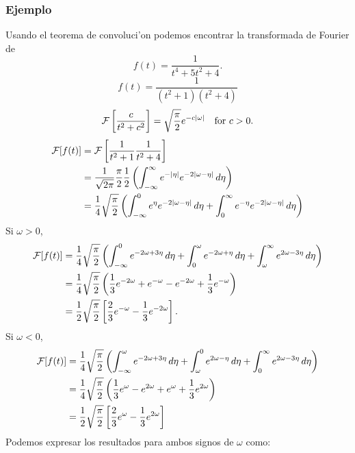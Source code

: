 \subsubsection{Ejemplo} Usando el teorema de convoluci'on podemos encontrar la transformada de Fourier de 
\begin{equation}
 f(t) =\frac{1}{t^4 + 5 t^2 + 4}. 
\end{equation}
\begin{equation}
 f(t) =\frac{1}{(t^2+1)(t^2+4)}
\end{equation}
\begin{equation}
{\cal F}\left[\frac{c}{t^2+c^2}\right] = \sqrt{\frac{\pi}{2}}e^{-c |\omega|}\quad\text{for }c > 0. 
\end{equation}
\begin{align}
{\cal F}[f(t)]
 &={\cal F}\left[\frac{1}{t^2+1}\frac{1}{t^2+4}\right] 
\\
 &=\frac{1}{\sqrt{2\pi}}\frac{\pi}{2}\frac{1}{2}\left(\int_{-\infty}^\infty e^{-|\eta|} e^{-2|\omega -\eta|}\,d\eta\right) 
\\
 &=\frac{1}{4}\sqrt{\frac{\pi}{2}}\left(\int_{-\infty}^0 e^\eta e^{-2|\omega -\eta|}\,d\eta
 +\int_0^\infty e^{-\eta} e^{-2|\omega -\eta|}\,d\eta\right)
\end{align}
Si $\omega > 0$,
\begin{align}
{\cal F}[f(t)]
 &=\frac{1}{4}\sqrt{\frac{\pi}{2}}\left(\int_{-\infty}^0 e^{-2\omega + 3\eta}\,d\eta
 +\int_0^\omega e^{-2\omega +\eta}\,d\eta
 +\int_\omega^\infty e^{2\omega - 3\eta}\,d\eta\right) 
\\
 &=\frac{1}{4}\sqrt{\frac{\pi}{2}}\left(\frac{1}{3} e^{-2\omega} + e^{-\omega}
 - e^{-2\omega} +\frac{1}{3} e^{-\omega}\right) 
\\
 &=\frac{1}{2}\sqrt{\frac{\pi}{2}}\left[ \frac{2}{3}e^{-\omega} -\frac{1}{3} e^{-2\omega}\right].
\end{align}
Si $\omega < 0$,
\begin{align}
{\cal F}[f(t)]
 &=\frac{1}{4}\sqrt{\frac{\pi}{2}}\left(\int_{-\infty}^\omega e^{-2\omega+3\eta}\,d\eta
 +\int_\omega^0 e^{2\omega -\eta}\,d\eta
 +\int_0^\infty e^{2\omega-3\eta}\,d\eta\right) 
\\
 &=\frac{1}{4}\sqrt{\frac{\pi}{2}}\left(\frac{1}{3} e^\omega - e^{2\omega}
 + e^\omega +\frac{1}{3} e^{2\omega}\right)\\
 &=\frac{1}{2}\sqrt{\frac{\pi}{2}}\left[\frac{2}{3}e^\omega -\frac{1}{3} e^{2\omega} \right]
\end{align}
Podemos expresar los resultados para ambos signos de $\omega$ como:
